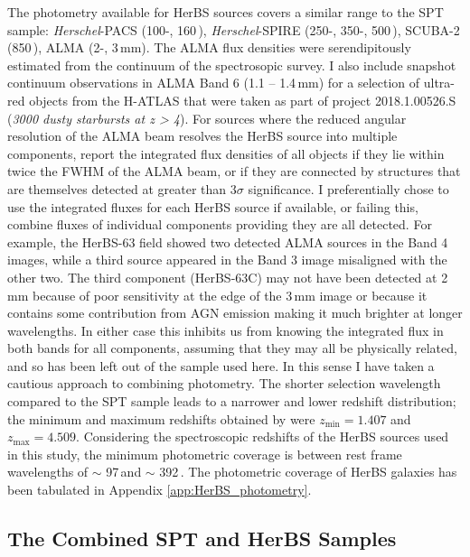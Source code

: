 The photometry available for HerBS sources covers a similar range to the SPT sample: \textit{Herschel}-PACS (100-, 160\,\micron),  \textit{Herschel}-SPIRE (250-, 350-, 500\,\micron), SCUBA-2 (850\,\micron), ALMA (2-, 3\,mm). The ALMA flux densities were serendipitously estimated from the continuum of the spectrosopic survey. I also include snapshot continuum observations in ALMA Band 6 (1.1 -- 1.4\,mm) for a selection of ultra-red objects from the H-ATLAS that were taken as part of project 2018.1.00526.S (\textit{3000 dusty starbursts at z > 4}). For sources where the reduced angular resolution of the ALMA beam resolves the HerBS source into multiple components, \citealt{Bendo_2023} report the integrated flux densities of all objects if they lie within twice the FWHM of the ALMA beam, or if they are connected by structures that are themselves detected at greater than 3$\sigma$ significance. I preferentially chose to use the integrated fluxes for each HerBS source if available, or failing this, combine fluxes of individual components providing they are all detected. For example, the HerBS-63 field showed two detected ALMA sources in the Band 4 images, while a third source appeared in the Band 3 image misaligned with the other two. The third component (HerBS-63C) may not have been detected at 2\,mm because of poor sensitivity at the edge of the 3\,mm image or because it contains some contribution from AGN emission making it much brighter at longer wavelengths. In either case this inhibits us from knowing the integrated flux in both bands for all components, assuming that they may all be physically related, and so has been left out of the sample used here. In this sense I have taken a cautious approach to combining photometry. The shorter selection wavelength compared to the SPT sample leads to a narrower and lower redshift distribution; the minimum and maximum redshifts obtained by \citealt{Urquhart_2022} were $z_{\textrm{min}} = 1.407$ and $z_{\textrm{max}} = 4.509$. Considering the spectroscopic redshifts of the HerBS sources used in this study, the minimum photometric coverage is between rest frame wavelengths of $\sim$ 97\,\micron and $\sim$ 392\,\micron. The photometric coverage of HerBS galaxies has been tabulated in Appendix \ref{app:HerBS_photometry}.


\subsection{The Combined SPT and HerBS Samples}

